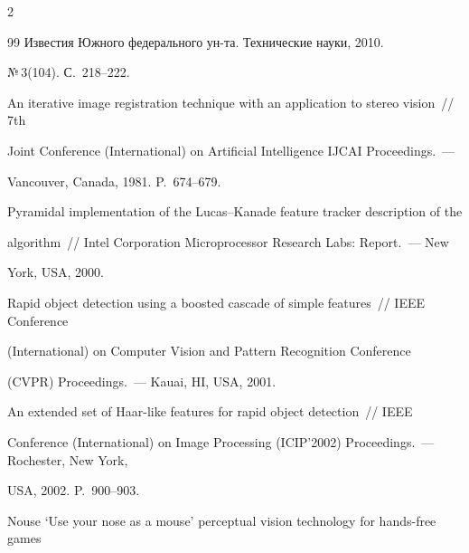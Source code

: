 \begin{multicols}{2}
{{\begin{thebibliography}{99}
Известия Южного федерального ун-та. Технические науки, 2010. 


№\,3(104). С.~218--222.









An iterative image registration technique with an application to stereo vision~// 7th 


Joint Conference (International) on Artificial Intelligence \mbox{IJCAI} Proceedings.~--- 


Vancouver, Canada, 1981. P.~674--679.









Pyramidal implementation of the Lucas--Kanade feature tracker description of the 


algorithm~// Intel Corporation Microprocessor Research Labs: Report.~--- New 


York, USA, 2000.









Rapid object detection using a boosted cascade of simple features~// IEEE Conference


(International) on Computer Vision and Pattern Recognition Conference 


(CVPR) Proceedings.~--- Kauai, HI, USA, 2001.









An extended set of Haar-like features for rapid object detection~// IEEE 


 Conference (International) on Image Processing (ICIP'2002) Proceedings.~--- Rochester, New York, 


USA, 2002. P.~900--903.









Nouse `Use your nose as a mouse' perceptual vision technology for hands-free games 



\end{thebibliography}}}
\end{multicols}
